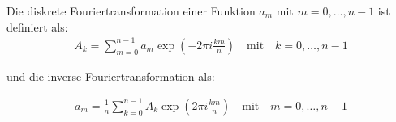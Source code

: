\documentclass[main.tex]{subfiles}
\begin{document}
Die diskrete Fouriertransformation einer Funktion $a_m$ mit $m = 0, \dots, n-1$
ist definiert als:
\begin{align}
    A_k = \sum_{m=0}^{n-1} a_m \exp(-2 \pi i\frac{ k m}{n}) \quad \text{mit}
    \quad k = 0, \dots, n-1
\end{align}

und die inverse Fouriertransformation als:

\begin{align}
    a_m = \frac{1}{n} \sum_{k=0}^{n-1} A_k \exp(2 \pi i\frac{ k m}{n}) \quad
    \text{mit} \quad m = 0, \dots, n-1
\end{align}




\end{document}

